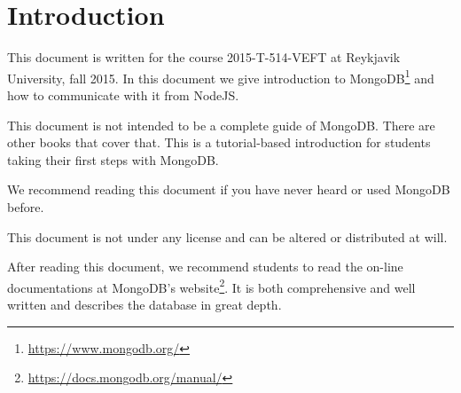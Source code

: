 \section{Introduction}\label{sec:introduction}
This document is written for the course 2015-T-514-VEFT at Reykjavik University, fall 2015. In this document we give introduction to MongoDB\footnote{\url{https://www.mongodb.org/}} and how to communicate with it from NodeJS.

This document is not intended to be a complete guide of MongoDB. There are other books that cover that. This is a tutorial-based introduction for students taking their first steps with MongoDB.

We recommend reading this document if you have never heard or used MongoDB before.

This document is not under any license and can be altered or distributed at will.

After reading this document, we recommend students to read the on-line documentations at MongoDB's website\footnote{\url{https://docs.mongodb.org/manual/}}. It is both comprehensive and well written and describes the database in great depth.
